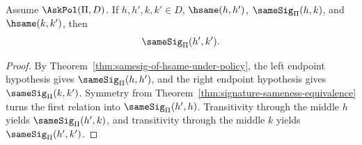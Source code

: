 \begin{theorem}
\label{thm:signature-sameness-endpoint-replacement}
Assume $\AskPol(\Pi,D)$. If $h,h',k,k'\in D$, $\hsame(h,h')$, $\sameSig_\Pi(h,k)$, and $\hsame(k,k')$, then
$$
  \sameSig_\Pi(h',k').
$$
\end{theorem}

\begin{proof}
By Theorem~\ref{thm:samesig-of-hsame-under-policy}, the left endpoint hypothesis gives $\sameSig_\Pi(h,h')$, and the right endpoint hypothesis gives $\sameSig_\Pi(k,k')$. Symmetry from Theorem~\ref{thm:signature-sameness-equivalence} turns the first relation into $\sameSig_\Pi(h',h)$. Transitivity through the middle $h$ yields $\sameSig_\Pi(h',k)$, and transitivity through the middle $k$ yields $\sameSig_\Pi(h',k')$.
\end{proof}
